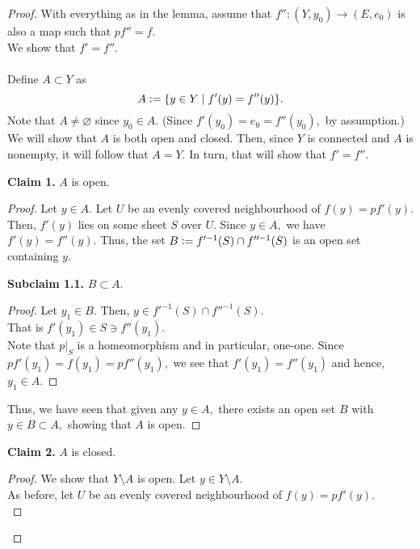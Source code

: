 \documentclass[12pt]{article}
\theoremstyle{definition}
\numberwithin{thm}{section}
\let\emptyset\varnothing
\newenvironment{blockquote}
{\begin{mdframed}[skipabove=0pt, skipbelow=0pt, innertopmargin=4pt, innerbottommargin=4pt, bottomline=false,topline=false,rightline=false, linewidth=2pt]}
{\end{mdframed}}
\begin{document}
\begin{proof} 
	With everything as in the lemma, assume that $f'':(Y, y_0) \to (E, e_0)$ is also a map such that $pf'' = f.$\\
	We show that $f' = f''.$\\~\\
	Define $A \subset Y$ as
	\begin{equation*} 
		A \vcentcolon= \{y \in Y \mid f'(y) = f''(y)\}.
	\end{equation*}
	Note that $A \neq \emptyset$ since $y_0 \in A.$ (Since $f'(y_0) = e_0 = f''(y_0),$ by assumption.)\\
	We will show that $A$ is both open and closed. Then, since $Y$ is connected and $A$ is nonempty, it will follow that $A = Y.$ In turn, that will show that $f' = f''.$\\
	\begin{blockquote}
		\textbf{Claim 1.} $A$ is open.
		\begin{proof} 
			Let $y \in A.$ Let $U$ be an evenly covered neighbourhood of $f(y) = pf'(y).$\\
			Then, $f'(y)$ lies on some sheet $S$ over $U.$ Since $y \in A,$ we have $f'(y) = f''(y).$ Thus, the set $B \vcentcolon= f'^{-1}(S) \cap f''^{-1}(S)$ is an open set containing $y.$\\
			\begin{blockquote}
				\textbf{Subclaim 1.1.} $B \subset A.$
				\begin{proof} 
					Let $y_1 \in B.$ Then, $y \in f'^{-1}(S) \cap f''^{-1}(S).$ \\
					That is $f'(y_1) \in S \ni f''(y_1).$\\
					Note that $p|_S$ is a homeomorphism and in particular, one-one. Since $pf'(y_1) = f(y_1) = pf''(y_1),$ we see that $f'(y_1) = f''(y_1)$ and hence, $y_1 \in A.$
				\end{proof}
			\end{blockquote}
			Thus, we have seen that given any $y \in A,$ there exists an open set $B$ with $y \in B \subset A,$ showing that $A$ is open.
		\end{proof}
	\end{blockquote}
	\begin{blockquote}
		\textbf{Claim 2.} $A$ is closed.
		\begin{proof} 
			We show that $Y\setminus A$ is open. Let $y \in Y\setminus A.$\\
			As before, let $U$ be an evenly covered neighbourhood of $f(y) = pf'(y).$\\

\end{proof}
\end{blockquote}
\end{proof}
\end{document}
